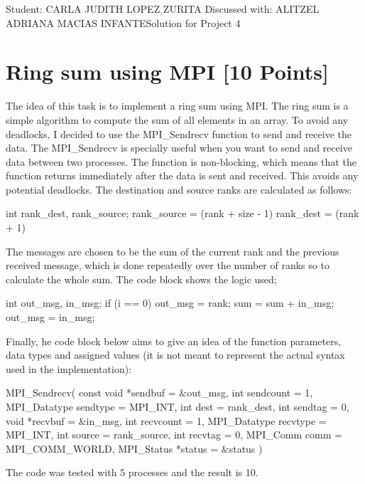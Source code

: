 \documentclass[unicode,11pt,a4paper,oneside,numbers=endperiod,openany]{scrartcl}
\begin{document}
\setassignment
{}

            {Student: CARLA JUDITH LOPEZ ZURITA}
            {Discussed with: ALITZEL ADRIANA MACIAS INFANTE}{Solution for Project 4}{}
\newline

\section{Ring sum using MPI [10 Points]}
The idea of this task is to implement a ring sum using MPI. The ring sum is a
simple algorithm to compute the sum of all elements in an array. To avoid any
deadlocks, I decided to use the
MPI\_Sendrecv function to send and receive the data.
The MPI\_Sendrecv is specially useful when you want to send and receive data
between two processes. The function is non-blocking, which means that the
function returns immediately after the data is sent and received. This avoids
any potential deadlocks.
The destination and source ranks are calculated as follows:
\begin{cppverbatim}
int rank_dest, rank_source;
rank_source = (rank + size - 1)
rank_dest = (rank + 1)
\end{cppverbatim}
The messages are chosen to be the sum of the current rank and the previous
received message, which is done repeatedly over the number of ranks so to
calculate the whole sum. The code block shows the logic used;
\begin{cppverbatim}
int out_msg, in_msg;
if (i == 0)
{
    out_msg = rank;
}
sum = sum + in_msg;
out_msg = in_msg;
\end{cppverbatim}
Finally, he code block below aims to give an idea of the function parameters, data types and
assigned values (it is not meant to represent the actual syntax used in the
implementation):
\begin{cppverbatim}
MPI_Sendrecv(
    const void *sendbuf = &out_msg,
    int sendcount = 1,
    MPI_Datatype sendtype = MPI_INT,
    int dest = rank_dest,
    int sendtag = 0,
    void *recvbuf = &in_msg,
    int recvcount = 1,
    MPI_Datatype recvtype = MPI_INT,
    int source = rank_source,
    int recvtag = 0,
    MPI_Comm comm = MPI_COMM_WORLD,
    MPI_Status *status = &status
)
\end{cppverbatim}
The code was tested with 5 processes and the result is 10.
\end{document}
